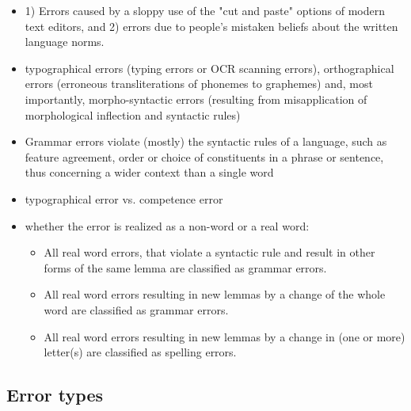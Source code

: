 \documentclass[a4paper,english,12pt]{article}
\begin{document}
\begin{spacing}{1.0}
\begin{itemize}
\item 1) Errors caused by a sloppy use of the "cut and paste" options of modern text editors, and 2) errors due to people's mistaken beliefs about the written language norms. \cite{Hagen2001a}
\item typographical errors (typing errors or OCR scanning errors), orthographical errors (erroneous transliterations of phonemes to graphemes) and, most importantly, morpho-syntactic errors (resulting from misapplication of morphological inflection and syntactic rules) \cite{Vosse1992}
\item Grammar errors violate (mostly) the syntactic rules of a language, such as feature agreement, order or choice of constituents in a phrase or sentence, thus concerning a wider context than a single word \cite[p.27]{Sofkova2003}
\item typographical error vs. competence error
\item whether the error is realized as a non-word or a real word:
	\begin{itemize}
	\item All real word errors, that violate a syntactic rule and result in other
	forms of the same lemma are classified as grammar errors.
	\item All real word errors resulting in new lemmas by a change of the
	whole word are classified as grammar errors.
	\item All real word errors resulting in new lemmas by a change in (one
	or more) letter(s) are classified as spelling errors. \cite[p.30]{Sofkova2003}
	\end{itemize}
\end{itemize}

\subsection{Error types}


\end{spacing}
\end{document}
